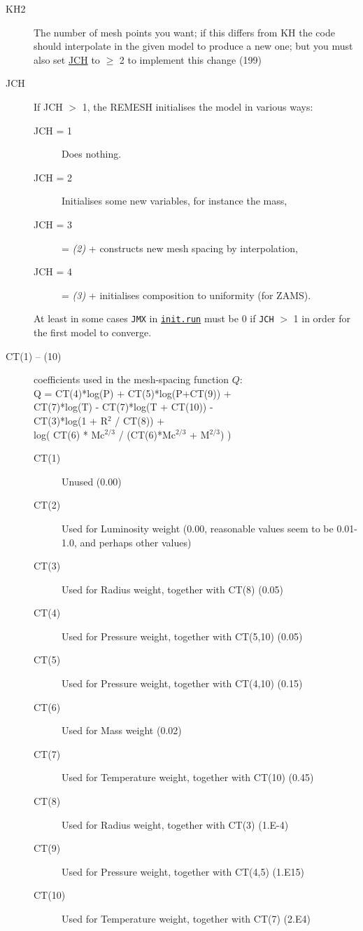 \begin{description}
\item[KH2]\hypertarget{kh2}{} The number of mesh points you want; if this differs from KH the code should interpolate in the 
  given model to produce a new one; but you must also set \hyperlink{jch}{JCH}  to $\ge$ 2 to implement this change  (199)
\item[JCH]\hypertarget{jch}{} If JCH $>$ 1, the REMESH initialises the model in various ways:
  \begin{description}
  \item[JCH = 1] Does nothing.
  \item[JCH = 2] Initialises some new variables, for instance the mass,
  \item[JCH = 3] = \emph{(2)} + constructs new mesh spacing by interpolation,
  \item[JCH = 4] = \emph{(3)} + initialises composition to uniformity (for ZAMS).
  \end{description}
  At least in some cases \texttt{JMX} in \hyperlink{initrun}{\texttt{init.run}} must be 0 if \texttt{JCH} $>$ 1 in order for the first model to converge.

\item[CT(1) -- (10)]\hypertarget{ct}{} coefficients used in the mesh-spacing function $Q$: \\
  Q = CT(4)*log(P) + CT(5)*log(P+CT(9)) + \\
      CT(7)*log(T) - CT(7)*log(T + CT(10)) - \\
      CT(3)*log(1 + R$^2$ / CT(8)) + \\
      log( CT(6) * Mc$^{2/3}$ / (CT(6)*Mc$^{2/3}$ + M$^{2/3}$) )
  \begin{description}
  \item[CT(1)] Unused (0.00)
  \item[CT(2)] Used for Luminosity weight (0.00, reasonable values seem to be 0.01-1.0, and perhaps other values)
  \item[CT(3)] Used for Radius weight, together with CT(8) (0.05)
  \item[CT(4)] Used for Pressure weight, together with CT(5,10) (0.05)
  \item[CT(5)] Used for Pressure weight, together with CT(4,10) (0.15)
  \item[CT(6)] Used for Mass weight (0.02)
  \item[CT(7)] Used for Temperature weight, together with CT(10) (0.45)
  \item[CT(8)] Used for Radius weight, together with CT(3) (1.E-4)
  \item[CT(9)] Used for Pressure weight, together with CT(4,5) (1.E15)
  \item[CT(10)] Used for Temperature weight, together with CT(7) (2.E4)
  \end{description}


\end{description}
